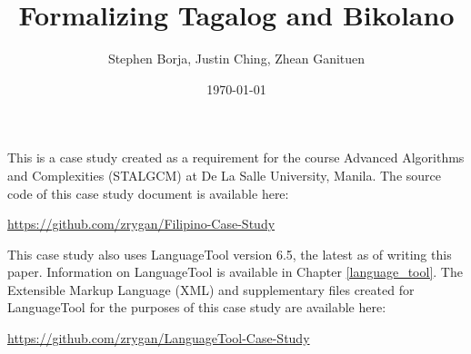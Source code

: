 \documentclass[12pt]{book}
\title{Formalizing Tagalog and Bikolano}
\author{Stephen Borja, Justin Ching, Zhean Ganituen}
\date{\today}
\begin{document}
\maketitle

This is a case study created as a requirement for the course Advanced Algorithms and Complexities (STALGCM) at De La Salle University, Manila. The source code of this case study document is available here:

\begin{center}
    \url{https://github.com/zrygan/Filipino-Case-Study}
\end{center}

This case study also uses LanguageTool version 6.5, the latest as of writing this paper. Information on LanguageTool is available in Chapter \ref{language_tool}. The Extensible Markup Language  (XML) and supplementary files created for LanguageTool for the purposes of this case study are available here:

\begin{center}
    \url{https://github.com/zrygan/LanguageTool-Case-Study}
\end{center}

\tableofcontents








\printbibliography
\end{document}

